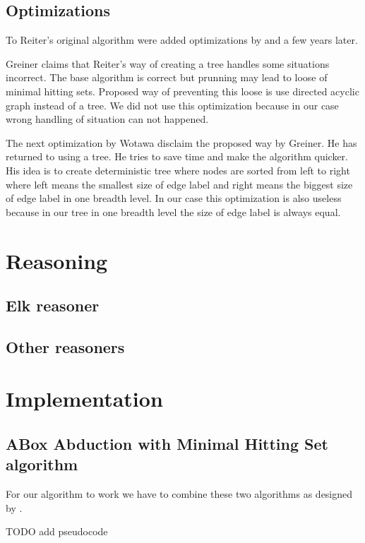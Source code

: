 \documentclass[12pt,a4paper]{article}
\begin{document}
\subsection{Optimizations}
To Reiter's original algorithm were added optimizations by \citep{greinerReitersCorrection} and \citep{wotawaReitersVariant} a few years later. 

Greiner claims that Reiter's way of creating a tree handles some situations incorrect. The base algorithm is correct but prunning may lead to loose of minimal hitting sets. Proposed way of preventing this loose is use directed acyclic graph instead of a tree. We did not use this optimization because in our case wrong handling of situation can not happened.

The next optimization by Wotawa disclaim the proposed way by Greiner. He has returned to using a tree. He tries to save time and make the algorithm quicker. His idea is to create deterministic tree where nodes are sorted from left to right where left means the smallest size of edge label and right means the biggest size of edge label in one breadth level. In our case this optimization is also useless because in our tree in one breadth level the size of edge label is always equal.

\section{Reasoning}

\subsection{Elk reasoner}

\subsection{Other reasoners}

\section{Implementation}

\subsection{ABox Abduction with Minimal Hitting Set algorithm}
For our algorithm to work we have to combine these two algorithms as designed by \citep{pukancovaAboxAbduction}. 

TODO add pseudocode
\end{document}
